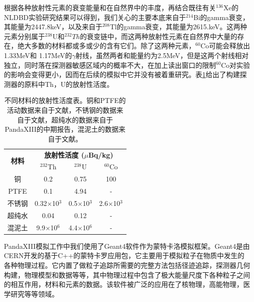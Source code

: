 根据各种放射性元素的衰变能量和在自然界中的丰度，再结合既往有关$^{136}$Xe的
NLDBD实验研究结果可以得到，我们关心的主要本底来自于$^{214}$Bi的gamma衰变，其能量为2447.8keV，以及来自于$^{208}$Tl的gamma衰变，其能量为2615.keV。这两种元素分别属于$^{238}$U和$^{232}Th$的衰变链中，而这两种放射性元素在自然界中大量的存在，绝大多数的材料都或多或少的含有它们。除了这两种元素，$^{60}$Co可能会释放出1.33MeV和
1.17MeV的$\gamma$射线，虽然两者和能量约为2.5MeV，但是这两个射线相对独立，同时落在探测器敏感区域内的概率不大，在加上读出窗口的限制$^{60}$Co对实验的影响会变得更小，因而在后续的模拟中它并没有被着重研究。表\ref{tab:activities}给出了构建探测器的原料中Th，U的放射性活度。
\renewcommand\arraystretch{1.4}
\begin{table}[tbh]
    \centering
    \begin{tabular*}{0.75\textwidth}{@{\extracolsep{\fill}}cccc}
        \hline
        \hline
        \multirow{2}{*}{\textbf{材料}} & \multicolumn{3}{c}{\textbf{放射性活度 ($\mu$Bq/kg)}}
      \\
                                   & $^{232}$Th & $^{238}$U  & $^{60}$Co \\ \hline
      铜                       & 0.2        &   0.75     &     100     \\
      PTFE                         & 0.1        &   4.94      &    -      \\
      不锈钢              & 0.32$\times$10$^3$          &    0.5$\times$10$^3$      &     2.6$\times$10$^3$     \\
      超纯水                          & 0.04          &     0.12      &     -     \\
      混泥土                     & 9.9$\times$10$^6$          &    4.4$\times$10$^6$   &    -    \\
        \hline
        \hline
    \end{tabular*}
    \caption{不同材料的放射性活度表。铜和PTFE的活动数据来自于文献\cite{Abgrall:2016cct}，不锈钢的数据来自于文献\cite{LZ_CDR}，超纯水的数据来自于PandaXIII的中期报告\cite{cdr}，混泥土的数据来自于文献\cite{Zeng2014}。}
    \label{tab:activities}
  \end{table}
  

PandaXIII模拟工作中我们使用了Geant4软件作为蒙特卡洛模拟框架。Geant4是由
CERN开发的基于C++的蒙特卡罗应用包，它主要用于模拟粒子在物质中发生的各种物理过程。它内置了做粒子追踪所需要的完整方法包括径迹追踪，探测器几何构建，物理模型和数据等等，其中物理过程中包含了极大能量尺度下各种粒子之间的相互作用，材料和元素的数据。该软件被广泛的应用在了核物理，高能物理，医学研究等等领域。

